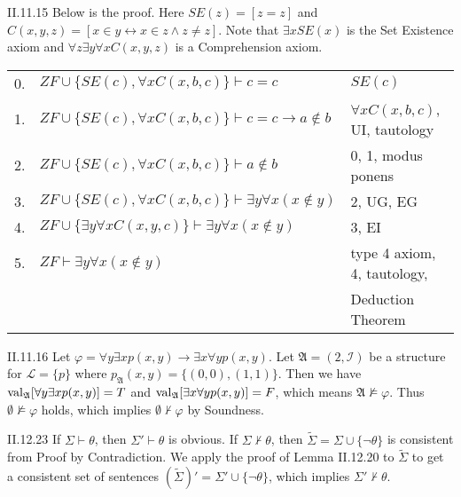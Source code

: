 \documentclass[12pt]{article}
\begin{document}
\begin{customthm}{II.11.15}
  Below is the proof. Here $SE(z)=[z=z]$ and $C(x,y,z)=[x\in y\leftrightarrow x\in z\wedge z\neq z]$. Note that $\exists xSE(x)$ is the Set Existence axiom and $\forall z\exists y\forall xC(x,y,z)$ is a Comprehension axiom.
  \begin{center}
    \begin{tabular}{lll}
      0. & $ZF\cup\{SE(c),\forall xC(x,b,c)\}\vdash c=c$ & $SE(c)$ \\
      1. & $ZF\cup\{SE(c),\forall xC(x,b,c)\}\vdash c=c\rightarrow a\not\in b$ & $\forall xC(x,b,c)$, UI, tautology \\
      2. & $ZF\cup\{SE(c),\forall xC(x,b,c)\}\vdash a\not\in b$ & 0, 1, modus ponens \\
      3. & $ZF\cup\{SE(c),\forall xC(x,b,c)\}\vdash\exists y\forall x(x\not\in y)$ & 2, UG, EG \\
      4. & $ZF\cup\{\exists y\forall xC(x,y,c)\}\vdash\exists y\forall x(x\not\in y)$ & 3, EI \\
      5. & $ZF\vdash\exists y\forall x(x\not\in y)$ & type 4 axiom, 4, tautology, \\
      && Deduction Theorem
    \end{tabular}
  \end{center}
\end{customthm}

\begin{customthm}{II.11.16}
  Let $\varphi=\forall y\exists xp(x,y)\rightarrow\exists x\forall yp(x,y)$. Let $\mathfrak{A}=(2,\mathcal{I})$ be a structure for $\mathcal{L}=\{p\}$ where $p_\mathfrak{A}(x,y)=\{(0,0),(1,1)\}$. Then we have $\mathop{\mathrm{val}}_\mathfrak{A}[\forall y\exists xp(x,y)]=T$ and $\mathop{\mathrm{val}}_\mathfrak{A}[\exists x\forall yp(x,y)]=F$, which means $\mathfrak{A}\not\models\varphi$. Thus $\emptyset\not\models\varphi$ holds, which implies $\emptyset\not\vdash\varphi$ by Soundness.
\end{customthm}

\begin{customthm}{II.12.23}
  If $\Sigma\vdash\theta$, then $\Sigma'\vdash\theta$ is obvious. If $\Sigma\not\vdash\theta$, then $\widetilde\Sigma=\Sigma\cup\{\neg\theta\}$ is consistent from Proof by Contradiction. We apply the proof of Lemma II.12.20 to $\widetilde\Sigma$ to get a consistent set of sentences $(\widetilde\Sigma)'=\Sigma'\cup\{\neg\theta\}$, which implies $\Sigma'\not\vdash\theta$.
\end{customthm}
\end{document}
